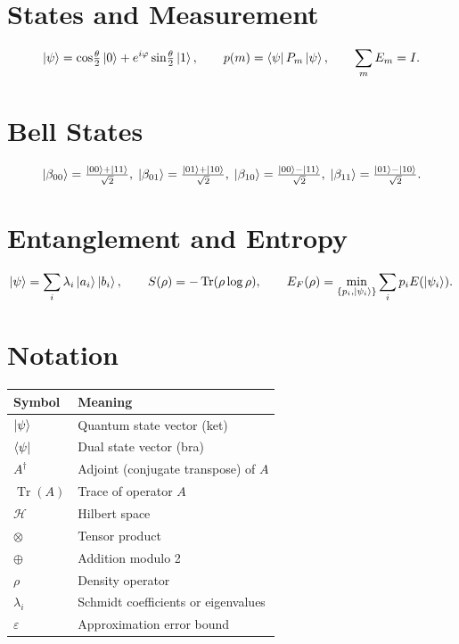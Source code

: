 \documentclass[12pt, a4paper, oneside]{report}
\theoremstyle{plain}
\theoremstyle{definition}
\theoremstyle{remark}
\DeclareMathOperator{\Tr}{Tr}
\newcommand{\Hcal}{\mathcal{H}}
\begin{document}
\section*{States and Measurement}
\[
  \ket{\psi} = \cos\!\tfrac{\theta}{2}\ket{0} + e^{i\varphi}\sin\!\tfrac{\theta}{2}\ket{1},
  \qquad
  p(m) = \bra{\psi}P_m\ket{\psi},
  \qquad
  \sum_m E_m = I.
\]

\section*{Bell States}
\[
  \ket{\beta_{00}} = \tfrac{\ket{00}+\ket{11}}{\sqrt{2}},\;
  \ket{\beta_{01}} = \tfrac{\ket{01}+\ket{10}}{\sqrt{2}},\;
  \ket{\beta_{10}} = \tfrac{\ket{00}-\ket{11}}{\sqrt{2}},\;
  \ket{\beta_{11}} = \tfrac{\ket{01}-\ket{10}}{\sqrt{2}}.
\]

\section*{Entanglement and Entropy}
\[
  \ket{\psi} = \sum_i\lambda_i\ket{a_i}\ket{b_i},\qquad
  S(\rho) = -\Tr(\rho\log\rho),\qquad
  E_F(\rho) = \min_{\{p_i,\ket{\psi_i}\}}\sum_i p_i E(\ket{\psi_i}).
\]

\section*{Notation}
\begin{center}
\begin{tabular}{ll}
\toprule
\textbf{Symbol} & \textbf{Meaning} \\
\midrule
$\ket{\psi}$    & Quantum state vector (ket) \\
$\bra{\psi}$    & Dual state vector (bra) \\
$A^\dagger$     & Adjoint (conjugate transpose) of $A$ \\
$\Tr(A)$        & Trace of operator $A$ \\
$\Hcal$         & Hilbert space \\
$\otimes$       & Tensor product \\
$\oplus$        & Addition modulo 2 \\
$\rho$          & Density operator \\
$\lambda_i$     & Schmidt coefficients or eigenvalues \\
$\varepsilon$   & Approximation error bound \\
\bottomrule
\end{tabular}
\end{center}
\end{document}
